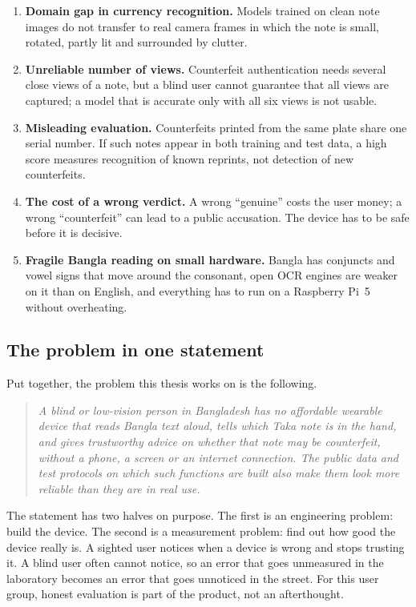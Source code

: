 \begin{enumerate}[noitemsep]
    \item \textbf{Domain gap in currency recognition.} Models trained on clean note images do not transfer to real camera frames in which the note is small, rotated, partly lit and surrounded by clutter.
    \item \textbf{Unreliable number of views.} Counterfeit authentication needs several close views of a note, but a blind user cannot guarantee that all views are captured; a model that is accurate only with all six views is not usable.
    \item \textbf{Misleading evaluation.} Counterfeits printed from the same plate share one serial number. If such notes appear in both training and test data, a high score measures recognition of known reprints, not detection of new counterfeits.
    \item \textbf{The cost of a wrong verdict.} A wrong ``genuine'' costs the user money; a wrong ``counterfeit'' can lead to a public accusation. The device has to be safe before it is decisive.
    \item \textbf{Fragile Bangla reading on small hardware.} Bangla has conjuncts and vowel signs that move around the consonant, open OCR engines are weaker on it than on English, and everything has to run on a Raspberry Pi~5 without overheating.
\end{enumerate}

\subsection*{The problem in one statement}
Put together, the problem this thesis works on is the following.

\begin{quote}
\textit{A blind or low-vision person in Bangladesh has no affordable wearable device that reads Bangla text aloud, tells which Taka note is in the hand, and gives trustworthy advice on whether that note may be counterfeit, without a phone, a screen or an internet connection. The public data and test protocols on which such functions are built also make them look more reliable than they are in real use.}
\end{quote}

The statement has two halves on purpose. The first is an engineering problem: build the device. The second is a measurement problem: find out how good the device really is. A sighted user notices when a device is wrong and stops trusting it. A blind user often cannot notice, so an error that goes unmeasured in the laboratory becomes an error that goes unnoticed in the street. For this user group, honest evaluation is part of the product, not an afterthought.

